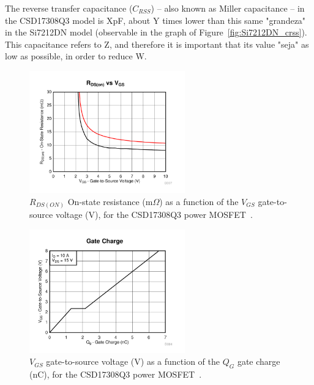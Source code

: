 The reverse transfer capacitance ($C_{RSS}$) -- also known as Miller capacitance -- in the CSD17308Q3 model is XpF, about Y times lower than this same "grandeza" in the Si7212DN model (observable in the graph of Figure~\ref{fig:Si7212DN_crss}). This capacitance refers to Z, and therefore it is important that its value "seja" as low as possible, in order to reduce W.%

\begin{figure}[h]
	\centering
	\includegraphics[width=0.6\textwidth]{Chapters/Figures/chapter3/CSD17308Q3_rdson.pdf}
	\caption{$R_{DS(ON)}$ On-state resistance (m$\Omega$) as a function of the $V_{GS}$ gate-to-source voltage (V), for the CSD17308Q3 power MOSFET~\cite{CSD17308Q3}.}
	\label{fig:CSD17308Q3_rdson}
\end{figure}
\begin{figure}[h]
	\centering
	\includegraphics[width=0.6\textwidth]{Chapters/Figures/chapter3/CSD17308Q3_gate_charge.pdf}
	\caption{$V_{GS}$ gate-to-source voltage (V) as a function of the $Q_G$ gate charge (nC), for the CSD17308Q3 power MOSFET~\cite{CSD17308Q3}.}
	\label{fig:CSD17308Q3_gate_charge}
\end{figure}



~\cite{LTC4012}~\cite{CSD17308Q3}


